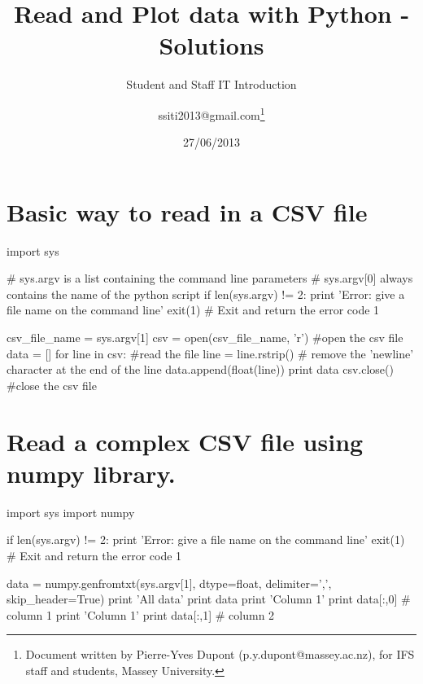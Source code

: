 \documentclass[article,10pt]{scrartcl}
\begin{document}
\title{Read and Plot data with Python - Solutions}
\subtitle{Student and Staff IT Introduction}
\date{27/06/2013}
\author{ssiti2013@gmail.com\footnote{Document written by Pierre-Yves Dupont (p.y.dupont@massey.ac.nz), for IFS staff and students, Massey University.}}
\maketitle

\section{Basic way to read in a CSV file}

\begin{python}
import sys

# sys.argv is a list containing the command line parameters
# sys.argv[0] always contains the name of the python script
if len(sys.argv) != 2:
   print 'Error: give a file name on the command line'
   exit(1) # Exit and return the error code 1

csv_file_name = sys.argv[1]
csv = open(csv_file_name, 'r') #open the csv file
data = []
for line in csv: #read the file
   line = line.rstrip() # remove the 'newline' character at the end of the line
   data.append(float(line))
print data
csv.close() #close the csv file
\end{python}

\section{Read a complex CSV file using \textbf{numpy} library.}
\begin{python}
import sys
import numpy

if len(sys.argv) != 2:
   print 'Error: give a file name on the command line'
   exit(1) # Exit and return the error code 1

data = numpy.genfromtxt(sys.argv[1], dtype=float, delimiter=',', skip_header=True) 
print 'All data'
print data
print 'Column 1'
print data[:,0] # column 1
print 'Column 1'
print data[:,1] # column 2
\end{python}
\newpage
\end{document}
